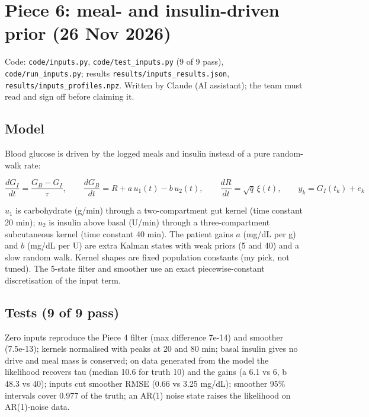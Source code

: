 \documentclass[11pt,a4paper]{article}
\begin{document}
\hypertarget{piece-6-meal--and-insulin-driven-prior-26-nov-2026}{%
\section{Piece 6: meal- and insulin-driven prior (26 Nov
2026)}\label{piece-6-meal--and-insulin-driven-prior-26-nov-2026}}

Code: \texttt{code/inputs.py}, \texttt{code/test\_inputs.py} (9 of 9
pass), \texttt{code/run\_inputs.py}; results
\texttt{results/inputs\_results.json},
\texttt{results/inputs\_profiles.npz}. Written by Claude (AI assistant);
the team must read and sign off before claiming it.

\hypertarget{model}{%
\subsection{Model}\label{model}}

Blood glucose is driven by the logged meals and insulin instead of a
pure random-walk rate:

\[\frac{dG_I}{dt}=\frac{G_B-G_I}{\tau},\qquad \frac{dG_B}{dt}=R+a\,u_1(t)-b\,u_2(t),\qquad \frac{dR}{dt}=\sqrt{q}\,\xi(t),\qquad y_k=G_I(t_k)+e_k\]

\(u_1\) is carbohydrate (g/min) through a two-compartment gut kernel
(time constant 20 min); \(u_2\) is insulin above basal (U/min) through a
three-compartment subcutaneous kernel (time constant 40 min). The
patient gains \(a\) (mg/dL per g) and \(b\) (mg/dL per U) are extra
Kalman states with weak priors (5 and 40) and a slow random walk. Kernel
shapes are fixed population constants (my pick, not tuned). The 5-state
filter and smoother use an exact piecewise-constant discretisation of
the input term.

\hypertarget{tests-9-of-9-pass}{%
\subsection{Tests (9 of 9 pass)}\label{tests-9-of-9-pass}}

Zero inputs reproduce the Piece 4 filter (max difference 7e-14) and
smoother (7.5e-13); kernels normalised with peaks at 20 and 80 min;
basal insulin gives no drive and meal mass is conserved; on data
generated from the model the likelihood recovers tau (median 10.6 for
truth 10) and the gains (a 6.1 vs 6, b 48.3 vs 40); inputs cut smoother
RMSE (0.66 vs 3.25 mg/dL); smoother 95\% intervals cover 0.977 of the
truth; an AR(1) noise state raises the likelihood on AR(1)-noise data.
\end{document}
